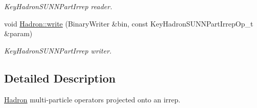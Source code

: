 \begin{DoxyCompactItemize}
\begin{DoxyCompactList}\small\item\em Key\+Hadron\+S\+U\+N\+N\+Part\+Irrep reader. \end{DoxyCompactList}\item 
void \mbox{\hyperlink{namespaceHadron_a1ab9211268895b4f05c4d46ff18dff6d}{Hadron\+::write}} (Binary\+Writer \&bin, const Key\+Hadron\+S\+U\+N\+N\+Part\+Irrep\+Op\+\_\+t \&param)
\begin{DoxyCompactList}\small\item\em Key\+Hadron\+S\+U\+N\+N\+Part\+Irrep writer. \end{DoxyCompactList}\end{DoxyCompactItemize}


\subsection{Detailed Description}
\mbox{\hyperlink{namespaceHadron}{Hadron}} multi-\/particle operators projected onto an irrep. 

